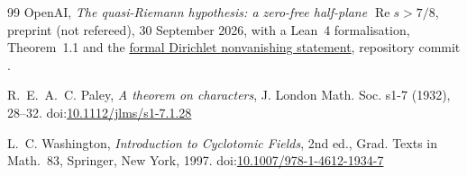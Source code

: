\documentclass[screen,reqno]{aomart}
\numberwithin{equation}{section}
\theoremstyle{definition}
\renewcommand{\Re}{\operatorname{Re}}
\begin{document}
\begin{thebibliography}{99}
 OpenAI, \emph{The quasi-Riemann hypothesis: a zero-free half-plane
$\Re s>7/8$}, preprint (not refereed), 30 September 2026, with a Lean~4 formalisation,
Theorem~1.1 and the
\href{https://github.com/openai/math/blob/1581d4cbdd69a0faf34b2089614fe2a814316a6a/lean/OAI/NumberTheory/DirichletL/Nonvanishing.lean}{formal Dirichlet nonvanishing statement},
repository commit .

 R.~E.~A.~C. Paley, \emph{A theorem on characters}, J. London Math. Soc.
s1-7 (1932), 28--32. doi:\href{https://doi.org/10.1112/jlms/s1-7.1.28}{10.1112/jlms/s1-7.1.28}

 L.~C. Washington, \emph{Introduction to Cyclotomic Fields}, 2nd ed., Grad. Texts
in Math.~83, Springer, New York, 1997. doi:\href{https://doi.org/10.1007/978-1-4612-1934-7}{10.1007/978-1-4612-1934-7}

\end{thebibliography}
\end{document}
